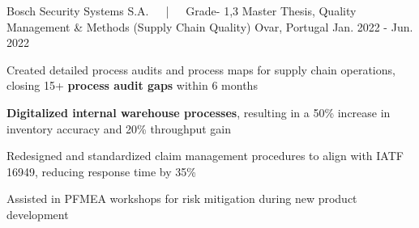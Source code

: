 \begin{cventries}

  \cventry
    {Bosch Security Systems S.A.~~~|~~~Grade- 1,3} %
    {Master Thesis, Quality Management \& Methods (Supply Chain Quality)} %
    {Ovar, Portugal} %
    {Jan. 2022 - Jun. 2022} %
    {
      \begin{cvitems} %
        \item {Created detailed process audits and process maps for supply chain operations, closing 15+ \textbf{process audit gaps} within 6 months}
        \item {\textbf{Digitalized internal warehouse processes}, resulting in a 50\% increase in inventory accuracy and 20\% throughput gain}
        \item {Redesigned and standardized claim management procedures to align with IATF 16949, reducing response time by 35\%}
        \item {Assisted in PFMEA workshops for risk mitigation during new product development}
      \end{cvitems}
    }


\end{cventries}
